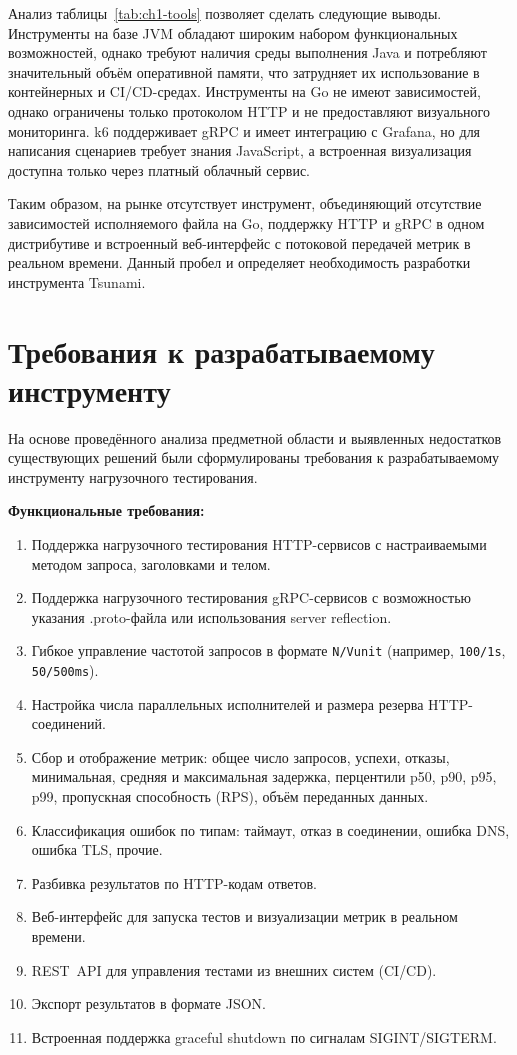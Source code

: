 Анализ таблицы~\ref{tab:ch1-tools} позволяет сделать следующие выводы.
Инструменты на базе JVM обладают широким набором функциональных возможностей, однако
требуют наличия среды выполнения Java и потребляют значительный объём оперативной памяти,
что затрудняет их использование в контейнерных и CI/CD-средах.
Инструменты на Go не имеют зависимостей,
однако ограничены только протоколом HTTP и не предоставляют визуального мониторинга.
k6 поддерживает gRPC и имеет интеграцию с Grafana, но для написания сценариев
требует знания JavaScript, а встроенная визуализация доступна только через
платный облачный сервис.

Таким образом, на рынке отсутствует инструмент, объединяющий отсутствие зависимостей исполняемого файла на Go, поддержку HTTP и gRPC в одном дистрибутиве
и встроенный веб-интерфейс с потоковой передачей метрик в реальном времени.
Данный пробел и определяет необходимость разработки инструмента Tsunami.


\section{Требования к разрабатываемому инструменту}

На основе проведённого анализа предметной области и выявленных недостатков
существующих решений были сформулированы требования к разрабатываемому
инструменту нагрузочного тестирования.

\textbf{Функциональные требования:}
\begin{enumerate}
  \item Поддержка нагрузочного тестирования HTTP-сервисов с настраиваемыми
    методом запроса, заголовками и телом.
  \item Поддержка нагрузочного тестирования gRPC-сервисов с возможностью
    указания .proto-файла или использования server reflection.
  \item Гибкое управление частотой запросов в формате \texttt{N/Vunit}
    (например, \texttt{100/1s}, \texttt{50/500ms}).
  \item Настройка числа параллельных исполнителей и размера резерва HTTP-соединений.
  \item Сбор и отображение метрик: общее число запросов, успехи, отказы,
    минимальная, средняя и максимальная задержка,
    перцентили p50, p90, p95, p99,
    пропускная способность (RPS), объём переданных данных.
  \item Классификация ошибок по типам: таймаут, отказ в соединении,
    ошибка DNS, ошибка TLS, прочие.
  \item Разбивка результатов по HTTP-кодам ответов.
  \item Веб-интерфейс для запуска тестов и визуализации метрик в реальном времени.
  \item REST~API для управления тестами из внешних систем (CI/CD).
  \item Экспорт результатов в формате JSON.
  \item Встроенная поддержка graceful shutdown по сигналам SIGINT\slash SIGTERM.
\end{enumerate}

